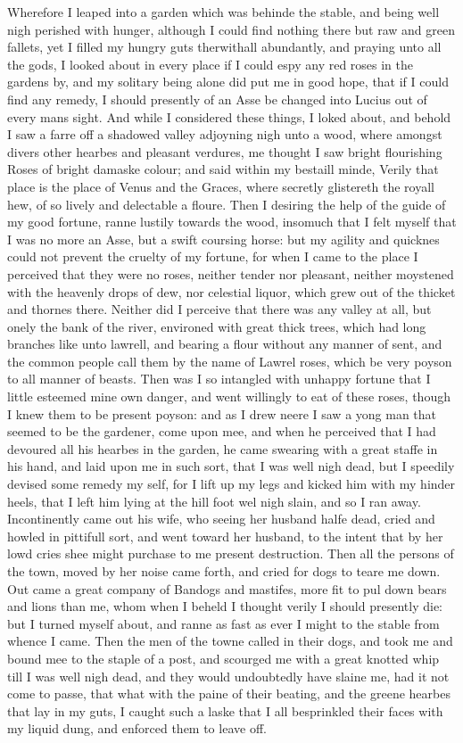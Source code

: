 Wherefore I leaped into a garden which was behinde the stable, and being well
nigh perished with hunger, although I could find nothing there but raw and
green fallets, yet I filled my hungry guts therwithall abundantly, and praying
unto all the gods, I looked about in every place if I could espy any red roses
in the gardens by, and my solitary being alone did put me in good hope, that if
I could find any remedy, I should presently of an Asse be changed into Lucius
out of every mans sight. And while I considered these things, I loked about,
and behold I saw a farre off a shadowed valley adjoyning nigh unto a wood,
where amongst divers other hearbes and pleasant verdures, me thought I saw
bright flourishing Roses of bright damaske colour; and said within my bestaill
minde, Verily that place is the place of Venus and the Graces, where secretly
glistereth the royall hew, of so lively and delectable a floure. Then I
desiring the help of the guide of my good fortune, ranne lustily towards the
wood, insomuch that I felt myself that I was no more an Asse, but a swift
coursing horse: but my agility and quicknes could not prevent the cruelty of my
fortune, for when I came to the place I perceived that they were no roses,
neither tender nor pleasant, neither moystened with the heavenly drops of dew,
nor celestial liquor, which grew out of the thicket and thornes there. Neither
did I perceive that there was any valley at all, but onely the bank of the
river, environed with great thick trees, which had long branches like unto
lawrell, and bearing a flour without any manner of sent, and the common people
call them by the name of Lawrel roses, which be very poyson to all manner of
beasts. Then was I so intangled with unhappy fortune that I little esteemed
mine own danger, and went willingly to eat of these roses, though I knew them
to be present poyson: and as I drew neere I saw a yong man that seemed to be
the gardener, come upon mee, and when he perceived that I had devoured all his
hearbes in the garden, he came swearing with a great staffe in his hand, and
laid upon me in such sort, that I was well nigh dead, but I speedily devised
some remedy my self, for I lift up my legs and kicked him with my hinder heels,
that I left him lying at the hill foot wel nigh slain, and so I ran away.
Incontinently came out his wife, who seeing her husband halfe dead, cried and
howled in pittifull sort, and went toward her husband, to the intent that by
her lowd cries shee might purchase to me present destruction. Then all the
persons of the town, moved by her noise came forth, and cried for dogs to teare
me down. Out came a great company of Bandogs and mastifes, more fit to pul down
bears and lions than me, whom when I beheld I thought verily I should presently
die: but I turned myself about, and ranne as fast as ever I might to the stable
from whence I came. Then the men of the towne called in their dogs, and took me
and bound mee to the staple of a post, and scourged me with a great knotted
whip till I was well nigh dead, and they would undoubtedly have slaine me, had
it not come to passe, that what with the paine of their beating, and the greene
hearbes that lay in my guts, I caught such a laske that I all besprinkled their
faces with my liquid dung, and enforced them to leave off.

